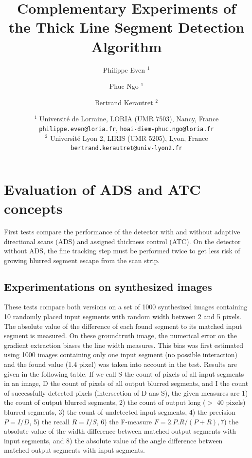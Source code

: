 \documentclass[11pt]{article}
\title{Complementary Experiments of the Thick Line Segment Detection Algorithm}
\date{
  $^1$ Universit\'e de Lorraine, LORIA (UMR 7503), Nancy, France \\
  \texttt{philippe.even@loria.fr},
  \texttt{hoai-diem-phuc.ngo@loria.fr}\\
  $^2$  Universit\'e Lyon 2, LIRIS (UMR 5205), Lyon, France\\
  \texttt{bertrand.kerautret@univ-lyon2.fr}}
\author{Philippe Even $^1$ \and Phuc Ngo $^1$ \and Bertrand Kerautret $^2$}
\begin{document}
\maketitle









\section{Evaluation of ADS and ATC concepts}
First tests compare the performance of the detector with and without
adaptive directional scans (ADS) and assigned thickness control (ATC).
On the detector without ADS, the fine tracking step must be performed
twice to get less risk of growing blurred segment escape from the scan
strip.



\subsection{Experimentations on synthesized images}
These tests compare both versions on a set of 1000 synthesized images containing
10 randomly placed input segments with random width between 2 and 5 pixels.
The absolute value of the difference of each found segment to its matched input segment is measured.
On these groundtruth image, the numerical error on the gradient extraction biases the line width measures.
This bias was first estimated using 1000 images containing only one input segment (no possible interaction) and the found value (1.4 pixel) was taken into account in the test.
Results are given in the following table.
If we call S the count of pixels of all input segments in an image, D the count of pixels of all output blurred segments, and I the count of successfully detected pixels (intersection of D ans S), the given measures are 1) the count of output blurred segments, 2) the count of output long ($>$ 40 pixels) blurred segments, 3) the count of undetected input segments, 4) the precision $P = I/D$, 5) the recall $R = I/S$, 6) the F-measure $F = 2.P.R / (P+R), 7$) the absolute value of the width difference between matched output segments with input segments, and 8) the absolute value of the angle difference between matched output segments with input segments.
\end{document}
